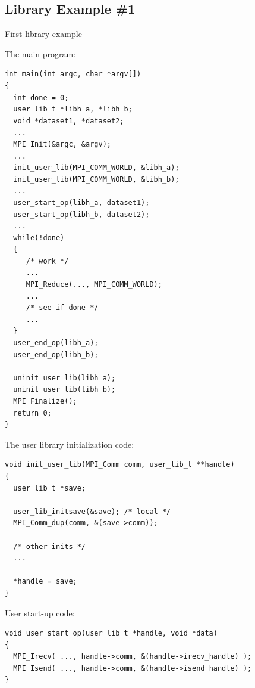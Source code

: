 \subsection{Library Example \#1}
\begin{example}
\label{context-ex5}
%
First library example

\noindent The main program:
\begin{lstlisting}[language={[MPI]C}]
int main(int argc, char *argv[])
{
  int done = 0;
  user_lib_t *libh_a, *libh_b;
  void *dataset1, *dataset2;
  ...
  MPI_Init(&argc, &argv);
  ...
  init_user_lib(MPI_COMM_WORLD, &libh_a);
  init_user_lib(MPI_COMM_WORLD, &libh_b);
  ...
  user_start_op(libh_a, dataset1);
  user_start_op(libh_b, dataset2);
  ...
  while(!done)
  {
     /* work */
     ...
     MPI_Reduce(..., MPI_COMM_WORLD);
     ...
     /* see if done */
     ...
  }
  user_end_op(libh_a);
  user_end_op(libh_b);

  uninit_user_lib(libh_a);
  uninit_user_lib(libh_b);
  MPI_Finalize();
  return 0;
}
\end{lstlisting}

\noindent The user library initialization code:
\begin{lstlisting}[language={[MPI]C}]
void init_user_lib(MPI_Comm comm, user_lib_t **handle)
{
  user_lib_t *save;

  user_lib_initsave(&save); /* local */
  MPI_Comm_dup(comm, &(save->comm));

  /* other inits */
  ...

  *handle = save;
}
\end{lstlisting}

\noindent User start-up code:
\begin{lstlisting}[language={[MPI]C}]
void user_start_op(user_lib_t *handle, void *data)
{
  MPI_Irecv( ..., handle->comm, &(handle->irecv_handle) );
  MPI_Isend( ..., handle->comm, &(handle->isend_handle) );
}
\end{lstlisting}


\end{example}
